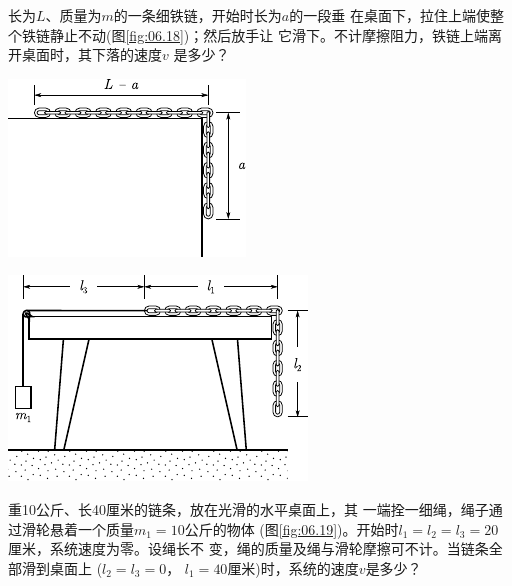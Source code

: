 \begin{exercises}
\exercise 长为$ L $、质量为$ m $的一条细铁链，开始时长为$ a $的一段垂
在桌面下，拉住上端使整个铁链静止不动(图\ref{fig:06.18})；然后放手让
它滑下。不计摩擦阻力，铁链上端离开桌面时，其下落的速度$ v $
是多少？
\vspace{1.56em}
\begin{figurex}
    \begin{minipage}[b]{0.4\linewidth}
        \centering
        \includegraphics{figure/fig06.18}
        \caption{}
        \label{fig:06.18}
    \end{minipage}
    \hfill
    \begin{minipage}[b]{0.6\linewidth}
        \centering
        \includegraphics{figure/fig06.19}
        \caption{}
        \label{fig:06.19}
    \end{minipage}
\end{figurex}

\exercise 重10公斤、长40厘米的链条，放在光滑的水平桌面上，其
一端拴一细绳，绳子通过滑轮悬着一个质量$ m _ { 1 } = 10 $公斤的物体
(图\ref{fig:06.19})。开始时$ l _ { 1 } = l _ { 2 } = l _ { 3 } = 20 $厘米，系统速度为零。设绳长不
变，绳的质量及绳与滑轮摩擦可不计。当链条全部滑到桌面上
($ l _ { 2 } = l _ { 3 } = 0 $， $ l _ { 1 } = 40 $厘米)时，系统的速度$ v $是多少？


\end{exercises}
